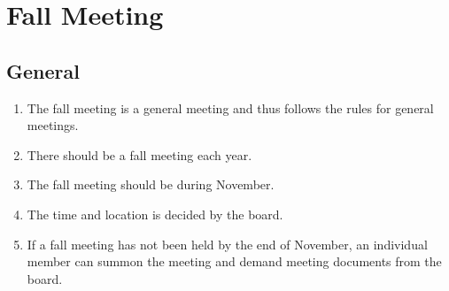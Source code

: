 \section*{Fall Meeting}
\subsection{General}
\begin{enumerate}
  \item The fall meeting is a general meeting and thus follows the rules for general meetings.
  \item There should be a fall meeting each year.
  \item The fall meeting should be during November.
  \item The time and location is decided by the board.
  \item If a fall meeting has not been held by the end of November, an individual member can summon the meeting and demand meeting documents from the board.
\end{enumerate}

